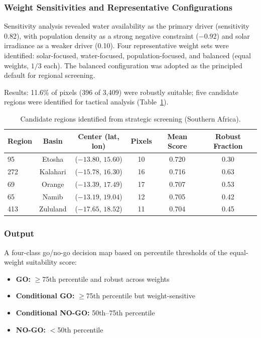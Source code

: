 \documentclass[11pt]{article}
\begin{document}
\subsubsection{Weight Sensitivities and Representative Configurations}
Sensitivity analysis revealed water availability as the primary driver (sensitivity 0.82), with population density as a strong negative constraint ($-0.92$) and solar irradiance as a weaker driver (0.10). Four representative weight sets were identified: solar-focused, water-focused, population-focused, and balanced (equal weights, $1/3$ each). The balanced configuration was adopted as the principled default for regional screening.

Results: 11.6\% of pixels (396 of 3,409) were robustly suitable; five candidate regions were identified for tactical analysis (Table~\ref{tab:candidates}).

\begin{table}[h]
\centering
\caption{Candidate regions identified from strategic screening (Southern Africa).}
\label{tab:candidates}
\begin{tabular}{lccccc}
\toprule
Region & Basin & Center (lat, lon) & Pixels & Mean Score & Robust Fraction \\
\midrule
95 & Etosha & ($-13.80$, $15.60$) & 10 & 0.720 & 0.30 \\
272 & Kalahari & ($-15.78$, $16.30$) & 16 & 0.716 & 0.63 \\
69 & Orange & ($-13.39$, $17.49$) & 17 & 0.707 & 0.53 \\
65 & Namib & ($-13.19$, $19.04$) & 12 & 0.705 & 0.42 \\
413 & Zululand & ($-17.65$, $18.52$) & 11 & 0.704 & 0.45 \\
\bottomrule
\end{tabular}
\end{table}

\subsubsection{Output}
A four-class go/no-go decision map based on percentile thresholds of the equal-weight suitability score:
\begin{itemize}
    \item \textbf{GO:} $\geq$75th percentile and robust across weights
    \item \textbf{Conditional GO:} $\geq$75th percentile but weight-sensitive
    \item \textbf{Conditional NO-GO:} 50th--75th percentile
    \item \textbf{NO-GO:} $<$50th percentile
\end{itemize}
\end{document}
